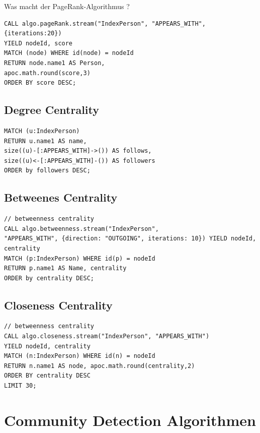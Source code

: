 \documentclass[ngerman,]{scrreprt}
\begin{document}
Was macht der PageRank-Algorithmus ?

\begin{verbatim}
CALL algo.pageRank.stream("IndexPerson", "APPEARS_WITH",
{iterations:20})
YIELD nodeId, score
MATCH (node) WHERE id(node) = nodeId
RETURN node.name1 AS Person,
apoc.math.round(score,3)
ORDER BY score DESC;
\end{verbatim}

\subsection{Degree Centrality}\label{degree-centrality}

\begin{verbatim}
MATCH (u:IndexPerson)
RETURN u.name1 AS name,
size((u)-[:APPEARS_WITH]->()) AS follows,
size((u)<-[:APPEARS_WITH]-()) AS followers
ORDER by followers DESC;
\end{verbatim}

\subsection{Betweenes Centrality}\label{betweenes-centrality}

\begin{verbatim}
// betweenness centrality
CALL algo.betweenness.stream("IndexPerson",
"APPEARS_WITH", {direction: "OUTGOING", iterations: 10}) YIELD nodeId, centrality
MATCH (p:IndexPerson) WHERE id(p) = nodeId
RETURN p.name1 AS Name, centrality
ORDER by centrality DESC;
\end{verbatim}

\subsection{Closeness Centrality}\label{closeness-centrality}

\begin{verbatim}
// betweenness centrality
CALL algo.closeness.stream("IndexPerson", "APPEARS_WITH")
YIELD nodeId, centrality
MATCH (n:IndexPerson) WHERE id(n) = nodeId
RETURN n.name1 AS node, apoc.math.round(centrality,2)
ORDER BY centrality DESC
LIMIT 30;
\end{verbatim}

\section{Community Detection Algorithmen}\label{community-detection-algorithmen}
\end{document}
